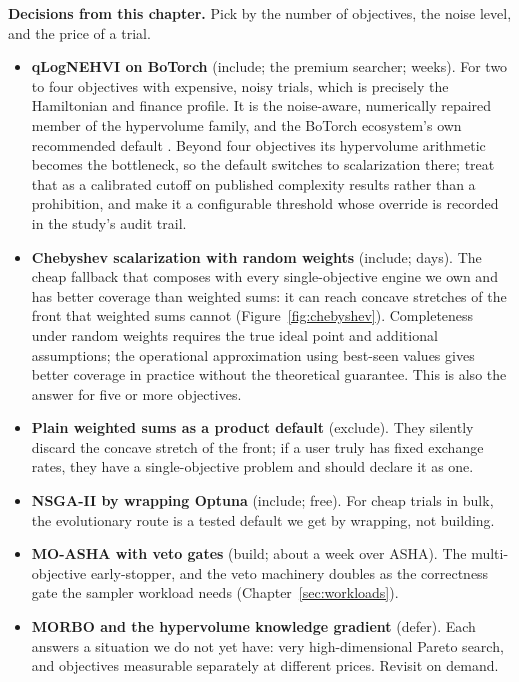 \begin{decisions}
\noindent\textbf{Decisions from this chapter.} Pick by the number of
objectives, the noise level, and the price of a trial.
\begin{itemize}[leftmargin=1.3em, itemsep=2pt]
\item \textbf{qLogNEHVI on BoTorch} (include; the premium searcher;
weeks). For two to four objectives with expensive, noisy trials, which
is precisely the Hamiltonian and finance profile. It is the noise-aware,
numerically repaired member of the hypervolume family, and the BoTorch
ecosystem's own recommended default \citep{daulton2021qnehvi,
ament2023logei}. Beyond four objectives its hypervolume arithmetic
becomes the bottleneck, so the default switches to scalarization there;
treat that as a calibrated cutoff on published complexity results
rather than a prohibition, and make it a configurable threshold whose
override is recorded in the study's audit trail.
\item \textbf{Chebyshev scalarization with random weights} (include;
days). The cheap fallback that composes with every single-objective
engine we own and has better coverage than weighted sums: it can reach
concave stretches of the front that weighted sums cannot
(Figure~\ref{fig:chebyshev}). Completeness under random weights
requires the true ideal point and additional assumptions; the
operational approximation using best-seen values gives better coverage
in practice without the theoretical guarantee. This is also the answer
for five or more objectives.
\item \textbf{Plain weighted sums as a product default} (exclude).
They silently discard the concave stretch of the front; if a user
truly has fixed exchange rates, they have a single-objective problem
and should declare it as one.
\item \textbf{NSGA-II by wrapping Optuna} (include; free). For cheap
trials in bulk, the evolutionary route is a tested default we get by
wrapping, not building.
\item \textbf{MO-ASHA with veto gates} (build; about a week over
ASHA). The multi-objective early-stopper, and the veto machinery
doubles as the correctness gate the sampler workload needs
(Chapter~\ref{sec:workloads}).
\item \textbf{MORBO and the hypervolume knowledge gradient} (defer).
Each answers a situation we do not yet have: very high-dimensional
Pareto search, and objectives measurable separately at different
prices. Revisit on demand.
\end{itemize}
\end{decisions}

